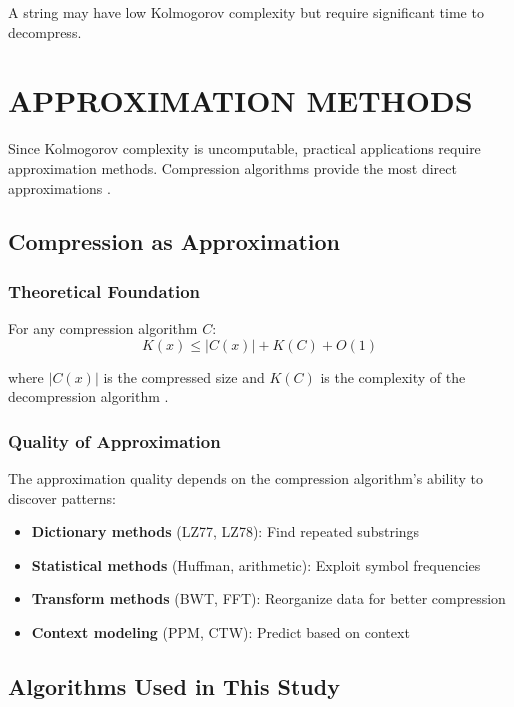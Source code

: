\documentclass[12pt,a4paper]{report}
\begin{document}
A string may have low Kolmogorov complexity but require significant time to decompress.

\chapter{APPROXIMATION METHODS}

Since Kolmogorov complexity is uncomputable, practical applications require approximation methods. Compression algorithms provide the most direct approximations \cite{cilibrasi2005clustering}.

\section{Compression as Approximation}

\subsection{Theoretical Foundation}

For any compression algorithm $C$:
\begin{equation}
K(x) \leq |C(x)| + K(C) + O(1)
\end{equation}

where $|C(x)|$ is the compressed size and $K(C)$ is the complexity of the decompression algorithm \cite{li2008introduction}.

\subsection{Quality of Approximation}

The approximation quality depends on the compression algorithm's ability to discover patterns:
\begin{itemize}
    \item \textbf{Dictionary methods} (LZ77, LZ78): Find repeated substrings
    \item \textbf{Statistical methods} (Huffman, arithmetic): Exploit symbol frequencies
    \item \textbf{Transform methods} (BWT, FFT): Reorganize data for better compression
    \item \textbf{Context modeling} (PPM, CTW): Predict based on context
\end{itemize}


\section{Algorithms Used in This Study}
\end{document}
